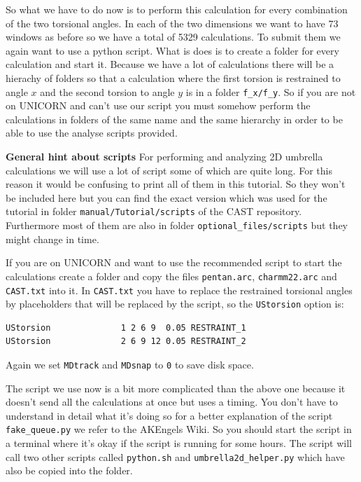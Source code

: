 \documentclass[a4paper,11pt]{scrartcl}
\begin{document}
So what we have to do now is to perform this calculation for every combination of the two torsional angles. In each of the two dimensions we want to have 73 windows as before so we have a total of 5329 calculations. To submit them we again want to use a python script. What is does is to create a folder for every calculation and start it. Because we have a lot of calculations there will be a hierachy of folders so that a calculation where the first torsion is restrained to angle $x$ and the second torsion to angle $y$ is in a folder \texttt{f\_x/f\_y}. So if you are not on UNICORN and can't use our script you must somehow perform the calculations in folders of the same name and the same hierarchy in order to be able to use the analyse scripts provided.

\textbf{General hint about scripts} For performing and analyzing 2D umbrella calculations we will use a lot of script some of which are quite long. For this reason it would be confusing to print all of them in this tutorial. So they won't be included here but you can find the exact version which was used for the tutorial in folder \texttt{manual/Tutorial/scripts} of the CAST repository. Furthermore most of them are also in folder \texttt{optional\_files/scripts} but they might change in time.

If you are on UNICORN and want to use the recommended script to start the calculations create a folder and copy the files \texttt{pentan.arc}, \texttt{charmm22.arc} and \texttt{CAST.txt} into it. In \texttt{CAST.txt} you have to replace the restrained torsional angles by placeholders that will be replaced by the script, so the \texttt{UStorsion} option is:
\begin{lstlisting}[frame=single,]
UStorsion              1 2 6 9  0.05 RESTRAINT_1
UStorsion              2 6 9 12 0.05 RESTRAINT_2
\end{lstlisting}
Again we set \texttt{MDtrack} and \texttt{MDsnap} to \texttt{0} to save disk space.
 
The script we use now is a bit more complicated than the above one because it doesn't send all the calculations at once but uses a timing. You don't have to understand in detail what it's doing so for a better explanation of the script \texttt{fake\_queue.py} we refer to the AKEngels Wiki. So you should start the script in a terminal where it's okay if the script is running for some hours. The script will call two other scripts called \texttt{python.sh} and \texttt{umbrella2d\_helper.py} which have also be copied into the folder. 
\end{document}
